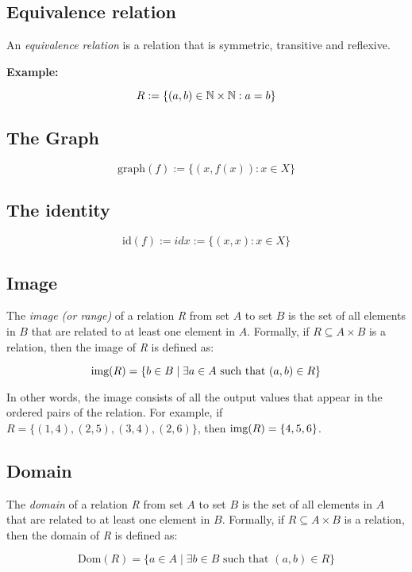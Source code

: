 \subsection{Equivalence relation}

An \emph{equivalence relation} is a relation that is symmetric, transitive and reflexive.

\textbf{Example:}

\[
	R:= \{ (a,b) \in \mathbb{N} \times \mathbb{N}: a = b\}
\]

\subsection{The Graph}

\[
	\text{graph}(f):= \{(x, f(x)): x \in X\}
\]

\subsection{The identity}

\[
	\text{id}(f):= idx:= \{(x, x): x \in X\}
\]

\subsection{Image}

The \emph{image (or range)} of a relation \emph{R} from set \(A\) to set \(B\) is the set 
of all elements in \(B\) that are related to at least one element in \(A\). Formally, if 
\(R \subseteq A \times B\) is a relation, then the image of \emph{R} is defined as:

\[
	\text{img}(R) = \{b \in B \mid \exists a \in A \text{ such that } (a,b) \in R\}
\]

In other words, the image consists of all the output values that appear in the ordered pairs of the 
relation. For example, if \(R = \{(1,4), (2,5), (3,4), (2,6)\}\), then \(\text{img}(R) = \{4, 5, 6\}\).

\subsection{Domain}

The \emph{domain} of a relation \emph{R} from set \(A\) to set \(B\) is the set of all elements in 
\(A\) that are related to at least one element in \(B\). Formally, if \(R \subseteq A \times B\) 
is a relation, then the domain of \emph{R} is defined as:

\[
	\text{Dom}(R) = \{a \in A \mid \exists b \in B \text{ such that } (a,b) \in R\}
\]

